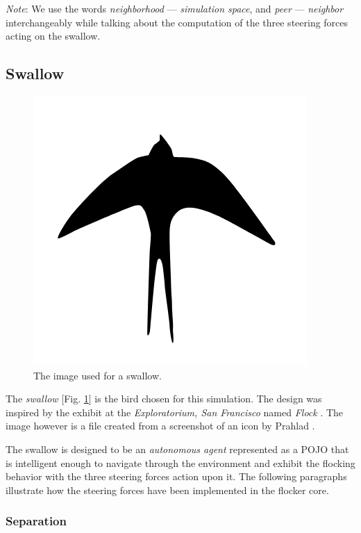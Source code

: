 \documentclass[../main]{subfiles}
\begin{document}
{\em Note}: We use the words {\em neighborhood} --- {\em simulation space}, and {\em peer} --- {\em neighbor} interchangeably while talking about the computation of the three steering forces acting on the swallow.

\subsection{Swallow}
\label{swallow}

\begin{figure}
	\centering
	\includegraphics[scale=0.15, frame]{resources/swallow.png}
	\caption{The image used for a swallow.}
	\label{swallowImg}
\end{figure}

The {\em swallow} [Fig. \ref{swallowImg}] is the bird chosen for this simulation. The design was inspired by the exhibit at the {\em Exploratorium, San Francisco} named {\em Flock} \cite{jillflock}. The image however is a  file created from a screenshot of an icon by Prahlad \cite{apSwallow}.

The swallow is designed to be an {\em autonomous agent} represented as a POJO that is intelligent enough to navigate through the environment and exhibit the flocking behavior with the three steering forces action upon it. The following paragraphs illustrate how the steering forces have been implemented in the flocker core.

\subsubsection{Separation}
\label{separation}
\end{document}
